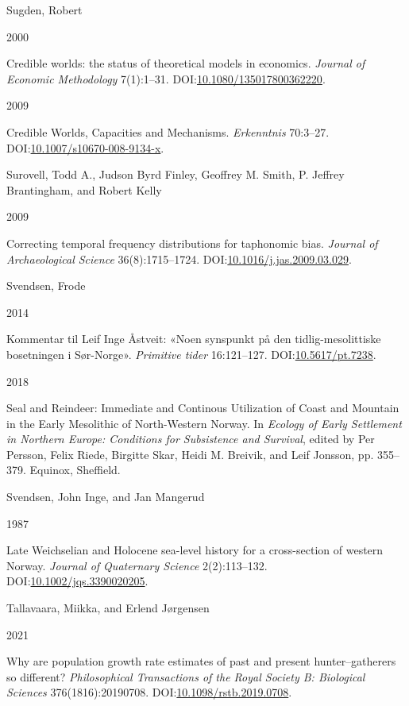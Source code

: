 \documentclass[
  12pt,
  a4paper,
  oneside]{book}
\newlength{\cslhangindent}
\newlength{\csllabelwidth}
\newlength{\cslentryspacingunit} %
\newenvironment{CSLReferences}[2] %
 {%
  \setlength{\parindent}{0pt}
  \ifodd #1
  \let\oldpar\par
  \def\par{\hangindent=\cslhangindent\oldpar}
  \fi
  \setlength{\parskip}{#2\cslentryspacingunit}
 }%
 {}
\newcommand{\CSLBlock}[1]{#1\hfill\break}
\newcommand{\CSLLeftMargin}[1]{\parbox[t]{\csllabelwidth}{#1}}
\newcommand{\CSLRightInline}[1]{\parbox[t]{\linewidth - \csllabelwidth}{#1}\break}
\begin{document}
\begin{CSLReferences}{0}{0}
\leavevmode{}%
\CSLBlock{Sugden, Robert}
\CSLLeftMargin{ 2000}
\CSLRightInline{{Credible worlds: the status of theoretical models in economics}. \emph{Journal of Economic Methodology} 7(1):1--31. DOI:\href{https://doi.org/10.1080/135017800362220}{10.1080/135017800362220}.}

\leavevmode{}%
\CSLLeftMargin{ 2009 }
\CSLRightInline{{Credible Worlds, Capacities and Mechanisms}. \emph{Erkenntnis} 70:3--27. DOI:\href{https://doi.org/10.1007/s10670-008-9134-x}{10.1007/s10670-008-9134-x}.}

\leavevmode{}%
\CSLBlock{Surovell, Todd A., Judson Byrd Finley, Geoffrey M. Smith, P. Jeffrey Brantingham, and Robert Kelly}
\CSLLeftMargin{ 2009}
\CSLRightInline{{Correcting temporal frequency distributions for taphonomic bias}. \emph{Journal of Archaeological Science} 36(8):1715--1724. DOI:\href{https://doi.org/10.1016/j.jas.2009.03.029}{10.1016/j.jas.2009.03.029}.}

\leavevmode{}%
\CSLBlock{Svendsen, Frode}
\CSLLeftMargin{ 2014}
\CSLRightInline{{Kommentar til Leif Inge Åstveit: «Noen synspunkt på den tidlig-mesolittiske bosetningen i Sør-Norge»}. \emph{Primitive tider} 16:121--127. DOI:\href{https://doi.org/10.5617/pt.7238}{10.5617/pt.7238}.}

\leavevmode{}%
\CSLLeftMargin{ 2018 }
\CSLRightInline{{Seal and Reindeer: Immediate and Continous Utilization of Coast and Mountain in the Early Mesolithic of North-Western Norway}. In \emph{{Ecology of Early Settlement in Northern Europe: Conditions for Subsistence and Survival}}, edited by Per Persson, Felix Riede, Birgitte Skar, Heidi M. Breivik, and Leif Jonsson, pp. 355--379. Equinox, Sheffield.}

\leavevmode{}%
\CSLBlock{Svendsen, John Inge, and Jan Mangerud}
\CSLLeftMargin{ 1987}
\CSLRightInline{Late Weichselian and Holocene sea-level history for a cross-section of western Norway. \emph{Journal of Quaternary Science} 2(2):113--132. DOI:\href{https://doi.org/10.1002/jqs.3390020205}{10.1002/jqs.3390020205}.}

\leavevmode{}%
\CSLBlock{Tallavaara, Miikka, and Erlend Jørgensen}
\CSLLeftMargin{ 2021}
\CSLRightInline{Why are population growth rate estimates of past and present hunter--gatherers so different? \emph{Philosophical Transactions of the Royal Society B: Biological Sciences} 376(1816):20190708. DOI:\href{https://doi.org/10.1098/rstb.2019.0708}{10.1098/rstb.2019.0708}.}


\end{CSLReferences}
\end{document}
